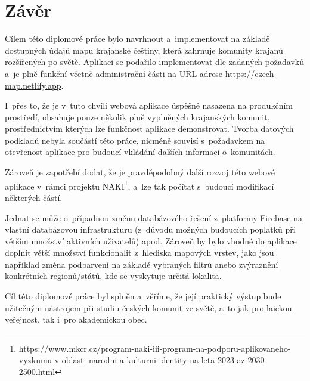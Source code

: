 \hypertarget{zuxe1vux11br}{%
\chapter*{Závěr}\label{zaver}}

Cílem této diplomové práce bylo navrhnout a~implementovat na základě dostupných údajů mapu krajanské češtiny, která zahrnuje komunity krajanů rozšířených po světě. Aplikaci se podařilo implementovat dle zadaných požadavků a~je plně funkční včetně administrační části na URL adrese \url{https://czech-map.netlify.app}.

I~přes to, že je v~tuto chvíli webová aplikace úspěšně nasazena na produkčním prostředí, obsahuje pouze několik plně vyplněných krajanských komunit, prostřednictvím kterých lze funkčnost aplikace demonstrovat. Tvorba datových podkladů nebyla součástí této práce, nicméně souvisí s~požadavkem na otevřenost aplikace pro budoucí vkládání dalších informací o~komunitách.

Zároveň je zapotřebí dodat, že je pravděpodobný další rozvoj této webové aplikace v~rámci projektu NAKI\footnote{https://www.mkcr.cz/program-naki-iii-program-na-podporu-aplikovaneho-vyzkumu-v-oblasti-narodni-a-kulturni-identity-na-leta-2023-az-2030-2500.html}, a~lze tak počítat s~budoucí modifikací některých částí.

Jednat se může o~případnou změnu databázového řešení z~platformy Firebase na vlastní databázovou infrastrukturu (z~důvodu možných budoucích poplatků při větším množství aktivních uživatelů) apod. Zároveň by bylo vhodné do aplikace doplnit větší množství funkcionalit z~hlediska mapových vrstev, jako jsou například změna podbarvení na základě vybraných filtrů anebo zvýraznění konkrétních regionů/států, kde se vyskytuje určitá lokalita.

Cíl této diplomové práce byl splněn a~věříme, že její praktický výstup bude užitečným nástrojem při studiu českých komunit ve světě, a~to jak pro laickou veřejnost, tak i~pro akademickou obec.
